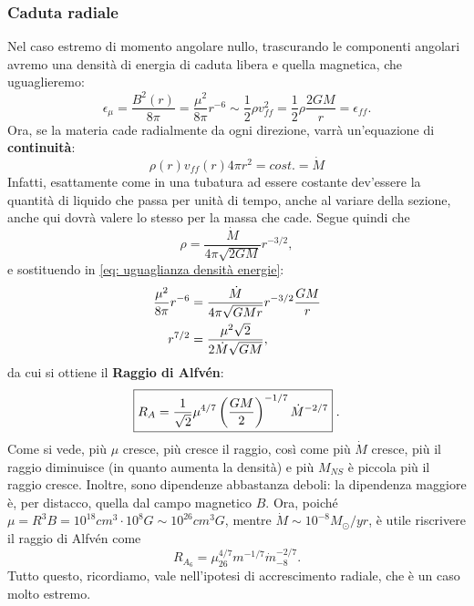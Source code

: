 \subsubsection{Caduta radiale}
Nel caso estremo di momento angolare nullo, trascurando le componenti angolari avremo una densità di energia di caduta libera e quella magnetica, che uguaglieremo:
\begin{equation}
    \epsilon_\mu = \frac{B^2(r)}{8\pi} = \frac{\mu^2}{8\pi}r^{-6}\sim \frac{1}{2}\rho v_{ff}^2 = \frac{1}{2}\rho \frac{2GM}{r} = \epsilon_{ff}.
    \label{eq: uguaglianza densità energie}
\end{equation}
Ora, se la materia cade radialmente da ogni direzione, varrà un'equazione di \textbf{continuità}:
\begin{equation}
    \rho(r)v_{ff}(r)4\pi r^2 = cost. = \dot{M}
\end{equation}
Infatti, esattamente come in una tubatura ad essere costante dev'essere la quantità di liquido che passa per unità di tempo, anche al variare della sezione, anche qui dovrà valere lo stesso per la massa che cade.
Segue quindi che
\begin{equation}
    \rho = \frac{\dot{M}}{4\pi\sqrt{2GM}}r^{-3/2},
\end{equation}
e sostituendo in \eqref{eq: uguaglianza densità energie}:
\begin{align}
    \frac{\mu^2}{8\pi}r^{-6} &= \frac{\dot{M}}{4\pi\sqrt{GMr}}r^{-3/2}\frac{GM}{r}\notag\\
    r^{7/2} &= \frac{\mu^2\sqrt{2}}{2\dot{M}\sqrt{GM}}\notag,
\end{align}
da cui si ottiene il \textbf{Raggio di Alfvén}:
\begin{equation}
    \boxed{R_A = \frac{1}{\sqrt{2}}\mu^{4/7}\left(\frac{GM}{2}\right)^{-1/7}\dot{M}^{-2/7}}\hspace{1mm}.
    \label{eq: raggio di Alfvén - radiale}
\end{equation}
Come si vede, più $\mu$ cresce, più cresce il raggio, così come più $\dot{M}$ cresce, più il raggio diminuisce (in quanto aumenta la densità) e più $M_{NS} $ è piccola più il raggio cresce.
Inoltre, sono dipendenze abbastanza deboli: la dipendenza maggiore è, per distacco, quella dal campo magnetico $B$.
Ora, poiché $\mu=R^3B = 10^{18}cm^3\cdot10^8G \sim10^{26} cm^3G$, mentre $\dot{M}\sim10^{-8}M_{\odot}/yr $, è utile riscrivere il raggio di Alfvén come 
\begin{equation}
    R_{A_6} = \mu_{26}^{4/7}m^{-1/7}\dot{m}^{-2/7}_{-8}.
    \label{eq: Alfvén radiale unità comode}
\end{equation}
Tutto questo, ricordiamo, vale nell'ipotesi di accrescimento radiale, che è un caso molto estremo.

